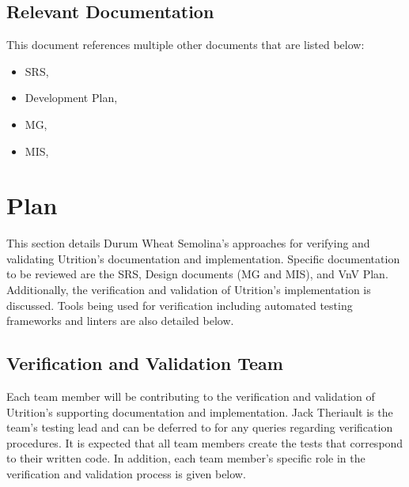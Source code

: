 \documentclass[12pt, titlepage]{article}
\begin{document}
	\subsection{Relevant Documentation}
	

		This document references multiple other documents that are listed below:
		
		\begin{itemize}
			\item SRS, \citet{SRS}
			\item Development Plan, \citet{DevelopmentPlan}
			\item MG, \citet{MG}
			\item MIS, \citet{MIS}
		\end{itemize}
	
	\section{Plan}
	
	This section details Durum Wheat Semolina's approaches for verifying and validating Utrition's documentation and implementation. Specific documentation to be reviewed are the SRS, Design documents (MG and MIS), and VnV Plan. Additionally, the verification and validation of Utrition's implementation is discussed. Tools being used for verification including automated testing frameworks and linters are also detailed below.
	
	\subsection{Verification and Validation Team}
	
	
	Each team member will be contributing to the verification and validation of Utrition's supporting documentation and implementation. Jack Theriault is the team's testing lead and can be deferred to for any queries regarding verification procedures. It is expected that all team members create the tests that correspond to their written code. In addition, each team member's specific role in the verification and validation process is given below.
	
\end{document}
